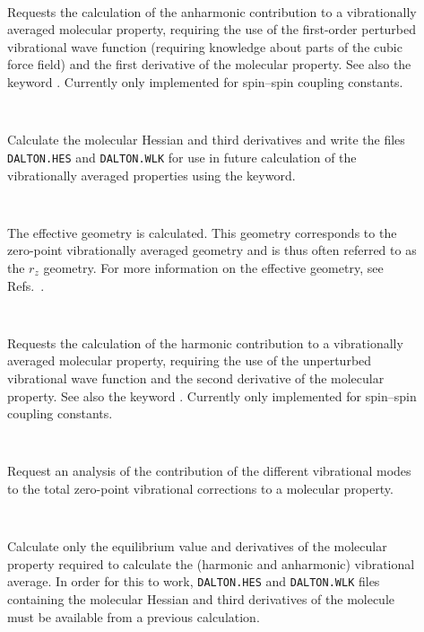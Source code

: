 \begin{description}

\item[]\verb| |\newline

Requests the calculation of the anharmonic contribution to a
vibrationally averaged molecular property, requiring the use of the
first-order perturbed vibrational wave function (requiring knowledge
about parts of the cubic force field) and the first derivative of the
molecular property. See also the keyword . Currently only
implemented for spin--spin coupling constants.

\item[]\verb| |\newline

Calculate the molecular Hessian and third derivatives and write the files
\verb|DALTON.HES| and \verb|DALTON.WLK| for use in future 
calculation of the vibrationally averaged properties using the
 keyword.

\item[]\verb| |\newline

The effective geometry is calculated. This geometry corresponds to the
zero-point vibrationally averaged geometry and is thus often referred
to as the $r_z$ geometry. For more information on the effective
geometry, see Refs.~\cite{poakrprtjcp112,krpoaprtjcp112}.

\item[]\verb| |\newline

Requests the calculation of the harmonic contribution to a
vibrationally averaged molecular property, requiring the use of the
unperturbed vibrational wave function and the second derivative of the
molecular property. See also the keyword . Currently only
implemented for spin--spin coupling constants.

\item[]\verb| |\newline

Request an analysis of the contribution of the different vibrational modes
to the total zero-point vibrational corrections to a molecular property.

\item[]\verb| |\newline

Calculate only the equilibrium value and derivatives of the molecular property
required to calculate the (harmonic and anharmonic) vibrational average. 
In order for this to work, \verb|DALTON.HES| and \verb|DALTON.WLK| files containing the molecular Hessian 
and third derivatives of the molecule must be available from a previous calculation.


\end{description}
